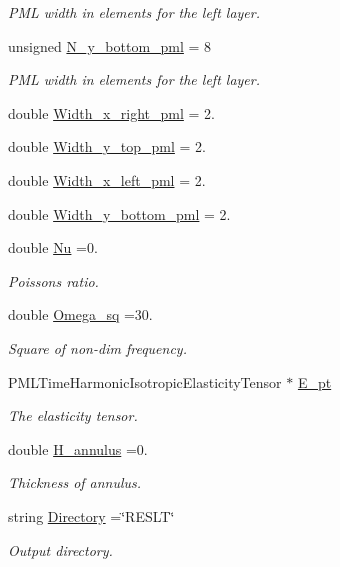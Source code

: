 \begin{DoxyCompactItemize}
\begin{DoxyCompactList}\small\item\em P\+ML width in elements for the left layer. \end{DoxyCompactList}\item 
unsigned \hyperlink{namespaceGlobal__Parameters_a79bff9b8e3435255541b71c0e3cc30a1}{N\+\_\+y\+\_\+bottom\+\_\+pml} = 8
\begin{DoxyCompactList}\small\item\em P\+ML width in elements for the left layer. \end{DoxyCompactList}\item 
double \hyperlink{namespaceGlobal__Parameters_a140b1b8aaef0bf2b94acf75d681d4545}{Width\+\_\+x\+\_\+right\+\_\+pml} = 2.
\item 
double \hyperlink{namespaceGlobal__Parameters_a175759402c54bb216b0599c6a031abea}{Width\+\_\+y\+\_\+top\+\_\+pml} = 2.
\item 
double \hyperlink{namespaceGlobal__Parameters_a28925335dcc7b2bed01d744a543be9aa}{Width\+\_\+x\+\_\+left\+\_\+pml} = 2.
\item 
double \hyperlink{namespaceGlobal__Parameters_a67848e80f63ec793108a4710a28cc3a9}{Width\+\_\+y\+\_\+bottom\+\_\+pml} = 2.
\item 
double \hyperlink{namespaceGlobal__Parameters_a20fccdcfa2c15ad8b951b9ada3bb1661}{Nu} =0.
\begin{DoxyCompactList}\small\item\em Poisson\textquotesingle{}s ratio. \end{DoxyCompactList}\item 
double \hyperlink{namespaceGlobal__Parameters_af9e1e178dfb7f5e35b452599bd4c4324}{Omega\+\_\+sq} =30.
\begin{DoxyCompactList}\small\item\em Square of non-\/dim frequency. \end{DoxyCompactList}\item 
P\+M\+L\+Time\+Harmonic\+Isotropic\+Elasticity\+Tensor $\ast$ \hyperlink{namespaceGlobal__Parameters_a9dc0631434879b47501f64851ad679b8}{E\+\_\+pt}
\begin{DoxyCompactList}\small\item\em The elasticity tensor. \end{DoxyCompactList}\item 
double \hyperlink{namespaceGlobal__Parameters_a0b73c5ead1114ae88bbd4cb0eb54f078}{H\+\_\+annulus} =0.
\begin{DoxyCompactList}\small\item\em Thickness of annulus. \end{DoxyCompactList}\item 
string \hyperlink{namespaceGlobal__Parameters_a301ab922df72030c660b21328d6caf76}{Directory} =\char`\"{}R\+E\+S\+LT\char`\"{}
\begin{DoxyCompactList}\small\item\em Output directory. \end{DoxyCompactList}\end{DoxyCompactItemize}


